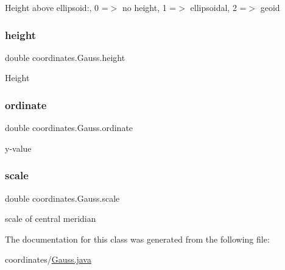 Height above ellipsoid\+:, 0 =$>$ no height, 1 =$>$ ellipsoidal, 2 =$>$ geoid \mbox{\label{classcoordinates_1_1_gauss_ad1543fe8a30e7f6dab1d0486bb5a935d}} 
\subsubsection{\texorpdfstring{height}{height}}
{\footnotesize\ttfamily double coordinates.\+Gauss.\+height\hspace{0.3cm}{\ttfamily [private]}}

Height \mbox{\label{classcoordinates_1_1_gauss_ab156b1da518d7637dacef40489a0dba4}} 
\subsubsection{\texorpdfstring{ordinate}{ordinate}}
{\footnotesize\ttfamily double coordinates.\+Gauss.\+ordinate\hspace{0.3cm}{\ttfamily [private]}}

y-\/value \mbox{\label{classcoordinates_1_1_gauss_aea6297c71e9258a7dfb80a823048dc0d}} 
\subsubsection{\texorpdfstring{scale}{scale}}
{\footnotesize\ttfamily double coordinates.\+Gauss.\+scale\hspace{0.3cm}{\ttfamily [private]}}

scale of central meridian 

The documentation for this class was generated from the following file\+:\begin{DoxyCompactItemize}
\item 
coordinates/\hyperlink{_gauss_8java}{Gauss.\+java}\end{DoxyCompactItemize}
